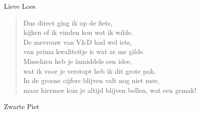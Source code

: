 \documentclass[12pt]{brief}
\begin{document}
\begin{letter}{Lieve Loes}
\begin{verse}
Dus direct ging ik op de fiets,\\
kijken of ik vinden kon wat ik wilde.\\
De mevrouw van V\&D had wel iets,\\
van prima kwaliteitje is wat ze me gilde.\\[0.5em]

Misschien heb je inmiddels een idee,\\
wat ik voor je verstopt heb ik dit grote pak.\\
In de groene cijfers blijven valt nog niet mee,\\
maar hiermee kun je altijd blijven bellen, wat een gemak!\\[2em]

\end{verse}


Zwarte Piet


\closing{}

\end{letter}
\end{document}

